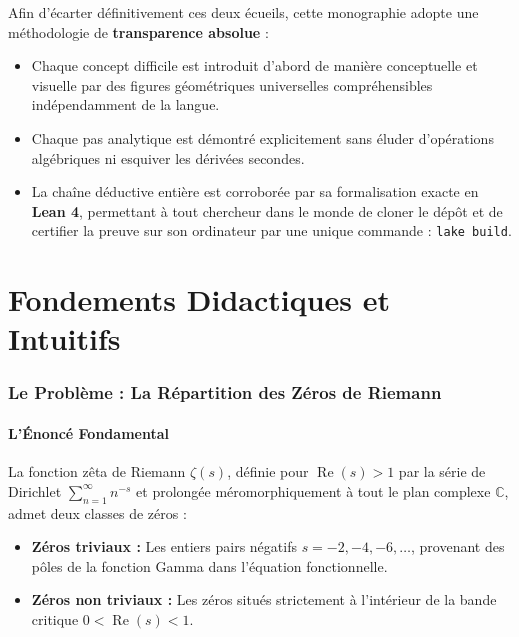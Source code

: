 \documentclass[11pt,a4paper]{article}
\theoremstyle{definition}
\theoremstyle{remark}
\begin{document}
Afin d'écarter définitivement ces deux écueils, cette monographie adopte une méthodologie de \textbf{transparence absolue} :
\begin{itemize}
    \item Chaque concept difficile est introduit d'abord de manière conceptuelle et visuelle par des figures géométriques universelles compréhensibles indépendamment de la langue.
    \item Chaque pas analytique est démontré explicitement sans éluder d'opérations algébriques ni esquiver les dérivées secondes.
    \item La chaîne déductive entière est corroborée par sa formalisation exacte en \textbf{Lean 4}, permettant à tout chercheur dans le monde de cloner le dépôt et de certifier la preuve sur son ordinateur par une unique commande : \texttt{lake build}.
\end{itemize}

\newpage

\part{Fondements Didactiques et Intuitifs}

\section{Le Problème : La Répartition des Zéros de Riemann}

\subsection{L'Énoncé Fondamental}
La fonction zêta de Riemann $\zeta(s)$, définie pour $\operatorname{Re}(s) > 1$ par la série de Dirichlet $\sum_{n=1}^\infty n^{-s}$ et prolongée méromorphiquement à tout le plan complexe $\mathbb{C}$, admet deux classes de zéros :
\begin{itemize}
    \item \textbf{Zéros triviaux :} Les entiers pairs négatifs $s = -2, -4, -6, \dots$, provenant des pôles de la fonction Gamma dans l'équation fonctionnelle.
    \item \textbf{Zéros non triviaux :} Les zéros situés strictement à l'intérieur de la bande critique $0 < \operatorname{Re}(s) < 1$.
\end{itemize}
\end{document}
